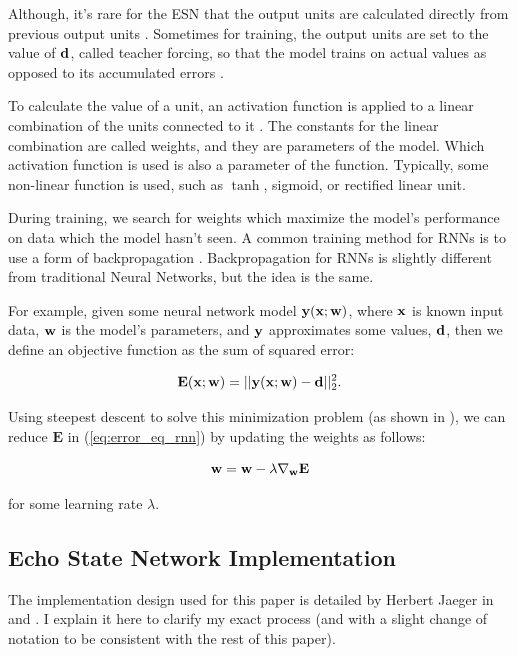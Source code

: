 \documentclass{article}
\begin{document}
Although, it's rare for the ESN that the output units are calculated
directly from previous output
units \cite{jaeger2002tutorial}. Sometimes for training, the output units are
set to the value of $\mathbf{d}$, called teacher forcing, so that the model trains on
actual values as opposed to its accumulated errors \cite{jaeger2002tutorial}.

To calculate the value of a unit, an activation function is applied to a
linear combination of the units connected to it
\cite{svozil1997introduction}. The constants for the linear combination are
called weights, and they are parameters of the model. Which activation
function is used is also a parameter of the function. Typically, some
non-linear function is used, such as $\tanh$, sigmoid, or rectified linear
unit.

During training, we search for weights which maximize the model's performance
on data which the model hasn't seen. A common training method for RNNs is to
use a form of backpropagation \cite{jaeger2002tutorial}. Backpropagation for
RNNs is slightly different from traditional Neural Networks, but the idea is
the same.

For example, given some neural network model $\mathbf{y}(\mathbf{x}; \mathbf{w})$, where $\mathbf{x}$ is
known input data, $\mathbf{w}$ is the model's parameters, and $\mathbf{y}$ approximates
some values, $\mathbf{d}$, then we define an objective function as the sum of
squared error:

\newcommand{\Ev}{\mathbf{E}}

\begin{equation}
    \Ev(\xv; \wv) = \vert \vert \yv(\xv; \wv) - \dv \vert \vert_2^2.
    \label{eq:error_eq_rnn}
\end{equation}

Using steepest descent to solve this minimization problem (as shown in
\cite{svozil1997introduction}), we can reduce $\Ev$ in
(\ref{eq:error_eq_rnn}) by updating the weights as follows:

\begin{equation}
    \wv = \wv - \lambda \nabla_\wv \Ev
\end{equation}

for some learning rate $\lambda$.

\subsection{Echo State Network Implementation}

The implementation design used for this paper is detailed by Herbert Jaeger
in \cite{jaeger2002tutorial} and \cite{jaeger2007echo}. I explain it here to
clarify my exact process (and with a slight change of notation to be
consistent with the rest of this paper).
\end{document}
